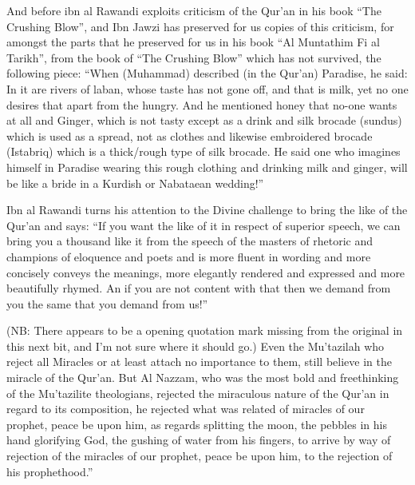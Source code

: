 \documentclass[12pt]{book}
\begin{document}

And before ibn al Rawandi exploits criticism of the Qur’an in his book “The
Crushing Blow”, and Ibn Jawzi has preserved for us copies of this criticism,
for amongst the parts that he preserved for us in his book “Al Muntathim Fi
al Tarikh”, from the book of “The Crushing Blow” which has not survived, the
following piece: “When (Muhammad) described (in the Qur’an) Paradise, he said:
In it are rivers of laban, whose taste has not gone off, and that is milk, yet
no one desires that apart from the hungry. And he mentioned honey that no-one
wants at all and Ginger, which is not tasty except as a drink and silk brocade
(sundus) which is used as a spread, not as clothes and likewise embroidered
brocade (Istabriq) which is a thick/rough type of silk brocade. He said one who
imagines himself in Paradise wearing this rough clothing and drinking milk and
ginger, will be like a bride in a Kurdish or Nabataean wedding!”\footnotemark


Ibn al Rawandi turns his attention to the Divine challenge to bring the like of
the Qur’an and says: “If you want the like of it in respect of superior speech,
we can bring you a thousand like it from the speech of the masters of rhetoric
and champions of eloquence and poets and is more fluent in wording and more
concisely conveys the meanings, more elegantly rendered and expressed and more
beautifully rhymed. An if you are not content with that then we demand from you
the same that you demand from us!”\footnotemark


(NB: There appears to be a opening quotation mark missing from the original in
this next bit, and I’m not sure where it should go.)
Even the Mu’tazilah who reject all Miracles or at least attach no importance to
them, still believe in the miracle of the Qur’an.\footnotemark
{}
But Al Nazzam, who was the most bold and freethinking of the Mu’tazilite
theologians, rejected the miraculous nature of the Qur’an in regard to its
composition, he rejected what was related of miracles of our prophet, peace be
upon him, as regards splitting the moon, the pebbles in his hand glorifying
God, the gushing of water from his fingers, to arrive by way of rejection of
the miracles of our prophet, peace be upon him, to the rejection of his
prophethood.”\footnotemark
\end{document}
